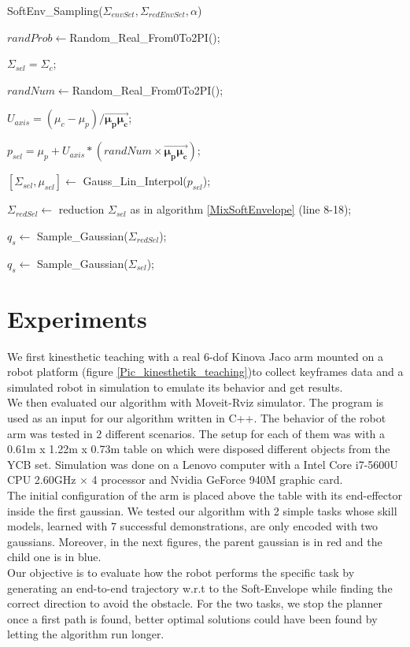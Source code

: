 \documentclass[letterpaper, 10 pt, conference]{ieeeconf}  %
\newcommand{\mb}[1]{{\boldsymbol{#1}}}
\begin{document}
\begin{algorithm}[H]
 \caption{SoftEnv\_Sampling($\Sigma_{envSet}, \Sigma_{redEnvSet},\alpha$)}\label{SoftEnv_Sampling}


\setcounter{AlgoLine}{0}
\BlankLine
 $randProb \leftarrow $Random\_Real\_From0To2PI();
 
	{
		$\Sigma_{sel} = \Sigma_c$;
	}
	\Else
	{
	 	$randNum \leftarrow $Random\_Real\_From0To2PI();
	 	
	 	$U_{axis}=(\mu_c - \mu_p)/\overrightarrow{{\mb{\mu_p}\mb{\mu_{c}}}}$;
	 	
	 	$p_{sel}=\mu_p+U_{axis}*(randNum \times \overrightarrow{{\mb{\mu_p}\mb{\mu_{c}}}})$;
	 	
	 	$[\Sigma_{sel},\mu_{sel}] \leftarrow$ Gauss\_Lin\_Interpol($p_{sel}$);
	}
	{
		$\Sigma_{redSel} \leftarrow $ reduction $\Sigma_{sel}$ as in algorithm \ref{MixSoftEnvelope} (line 8-18);
		
		$q_s \leftarrow $ Sample\_Gaussian($\Sigma_{redSel}$);
	}
	\Else
	{
		$q_s \leftarrow $ Sample\_Gaussian($\Sigma_{sel}$);
	}
\end{algorithm}

\section{Experiments}
We first kinesthetic teaching with a real 6-dof Kinova Jaco arm mounted on a robot platform (figure \ref{Pic_kinesthetik_teaching})to collect keyframes data and a simulated robot in simulation to emulate its behavior and get results.\\
We then evaluated our algorithm with Moveit-Rviz simulator. The program is used as an input for our algorithm written in C++. The behavior of the robot arm was tested in 2 different scenarios. The setup for each of them was with a 0.61m x 1.22m x 0.73m table on which were disposed different objects from the YCB set. Simulation was done on a Lenovo computer with  a Intel Core i7-5600U CPU 2.60GHz × 4 processor and Nvidia GeForce 940M graphic card.\\
 The initial configuration of the arm is placed above the table with its end-effector inside the first gaussian. We tested our algorithm with 2 simple tasks whose skill models, learned with 7 successful demonstrations, are only encoded with two gaussians.  Moreover, in the next figures, the parent gaussian is in red and the child one is in blue.\\
  Our objective is to evaluate how the robot performs the specific task by generating an end-to-end trajectory w.r.t to the Soft-Envelope while finding the correct direction to avoid the obstacle. For the two tasks, we stop the planner once a first path is found, better optimal solutions could have been found by letting the algorithm run longer.
\end{document}
